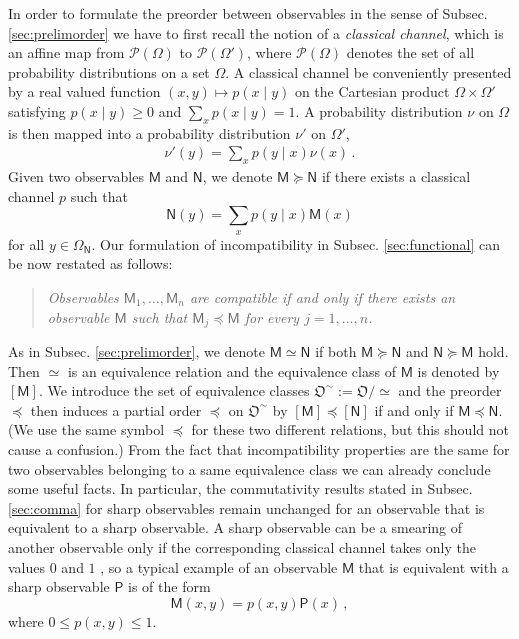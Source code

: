 \documentclass[12pt]{article}
\theoremstyle{definition}
\newcommand{\Mo}{\mathsf{M}}%
\newcommand{\No}{\mathsf{N}}%
\newcommand{\Po}{\mathsf{P}}%
\newcommand{\pleq}{\preceq}
\newcommand{\pgeq}{\succeq}
\newcommand{\obs}{\mathfrak{O}}
\begin{document}
{ In order to formulate the preorder between observables in the sense of Subsec. \ref{sec:prelimorder}
we have to first recall the notion of a \emph{classical channel}, which is an affine map from $\mathcal{P}(\Omega)$ to $\mathcal{P}(\Omega')$, where $\mathcal{P}(\Omega)$ denotes
the set of all probability distributions on a set $\Omega$. 
A classical channel be conveniently presented by a real valued function $(x,y) \mapsto p(x \mid y)$ on the Cartesian product $\Omega \times \Omega'$ satisfying $p(x \mid y) \geq 0$ and $\sum_x p(x \mid y) = 1$.
A probability distribution $\nu$ on $\Omega$ is then mapped into a probability distribution $\nu'$ on $\Omega'$,
\begin{align}
\nu'(y) = \sum_x p(y \mid x) \nu(x) \, .
\end{align}
Given two observables $\Mo$ and $\No$, we denote $\Mo\pgeq\No$ if there exists a classical channel $p$ such that
\begin{equation}\label{eq:smearing}
\No(y)=\sum_x p(y \mid x) \Mo(x) 
\end{equation}
for all $y\in\Omega_{\No}$.
Our formulation of incompatibility in Subsec. \ref{sec:functional} can be now restated as follows:
\begin{quote}
\emph{
Observables $\Mo_1,\ldots,\Mo_n$ are compatible if and only if 
there exists an observable $\Mo$ such that $\Mo_j\pleq \Mo$ for every $j=1,\ldots,n$.}
\end{quote}

As in Subsec. \ref{sec:prelimorder}, we denote $\Mo\simeq \No$ if both $\Mo \pgeq \No$ and $\No\pgeq \Mo$ hold. 
Then $\simeq$ is an equivalence relation and the equivalence class of $\Mo$ is denoted by $[\Mo]$. 
We introduce the set of equivalence classes $\obs^\sim := \obs / \simeq$ and the preorder $\pleq$ then induces a partial order
 $\pleq$ on $\obs^\sim$  by $[\Mo] \pleq [\No]$ if and only if $\Mo \pleq \No$. 
(We use the same symbol $\pleq$ for these two different relations, but this should not cause a confusion.)
From the fact that incompatibility properties are the same for two observables belonging to a same equivalence class we can already conclude some useful facts.
In particular, the commutativity results stated in Subsec. \ref{sec:comma} for sharp observables remain unchanged for an observable that is equivalent to a sharp observable. 
A sharp observable can be a smearing of another observable only if the corresponding classical channel takes only the values $0$ and $1$ \cite{JePu07}, so a typical example of an observable $\Mo$ that is equivalent with a sharp observable $\Po$ is of the form
\begin{equation}
\Mo(x,y)= p(x,y) \Po(x) \, , 
\end{equation}
where $0 \leq p(x,y) \leq 1$. 


}
\end{document}
